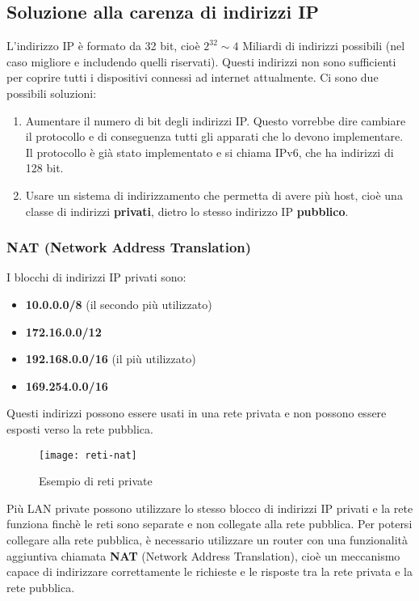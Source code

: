 \documentclass[a4paper]{article}
\begin{document}
\subsection{Soluzione alla carenza di indirizzi IP}
L'indirizzo IP è formato da 32 bit, cioè \( 2^{32} \sim 4 \text{ Miliardi} \) di indirizzi
possibili (nel caso migliore e includendo quelli riservati). Questi indirizzi non sono
sufficienti per coprire tutti i dispositivi connessi ad internet attualmente.
Ci sono due possibili soluzioni:
\begin{enumerate}
  \item Aumentare il numero di bit degli indirizzi IP. Questo vorrebbe dire cambiare
    il protocollo e di conseguenza tutti gli apparati che lo devono implementare.
    Il protocollo è già stato implementato e si chiama IPv6, che ha
    indirizzi di 128 bit.

  \item Usare un sistema di indirizzamento che permetta di avere più host, cioè una classe
    di indirizzi \textbf{privati}, dietro lo stesso indirizzo IP \textbf{pubblico}.
\end{enumerate}

\subsubsection{NAT (Network Address Translation)}
I blocchi di indirizzi IP privati sono:
\begin{itemize}
  \item \textbf{10.0.0.0/8} (il secondo più utilizzato)
  \item \textbf{172.16.0.0/12}
  \item \textbf{192.168.0.0/16} (il più utilizzato)
  \item \textbf{169.254.0.0/16}
\end{itemize}
Questi indirizzi possono essere usati in una rete privata e non possono essere esposti
verso la rete pubblica.
\begin{figure}[H]
  \centering
  \texttt{[image: reti-nat]}
  \caption{Esempio di reti private}
\end{figure}
\noindent
Più LAN private possono utilizzare lo stesso blocco di indirizzi IP privati e la rete
funziona finchè le reti sono separate e non collegate alla rete pubblica. Per potersi
collegare alla rete pubblica, è necessario utilizzare un router con una funzionalità
aggiuntiva chiamata \textbf{NAT} (Network Address Translation), cioè un meccanismo
capace di indirizzare correttamente le richieste e le risposte tra la rete privata e
la rete pubblica.
\end{document}

